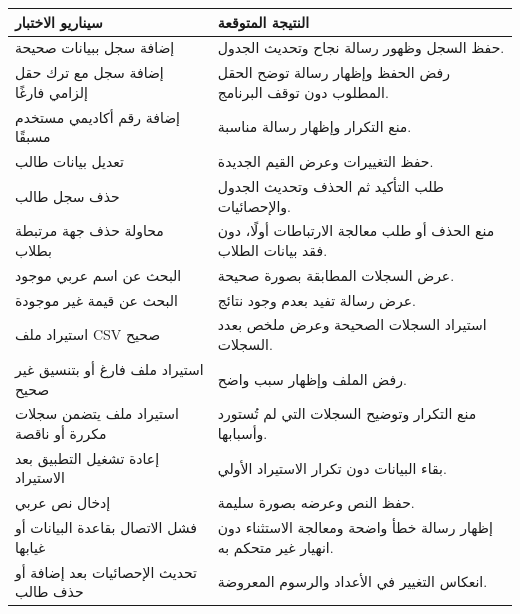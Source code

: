\documentclass[12pt,a4paper]{article}
\begin{document}
\begin{longtable}{|p{6cm}|p{8cm}|}
\hline
\textbf{سيناريو الاختبار} & \textbf{النتيجة المتوقعة}\\ \hline
إضافة سجل ببيانات صحيحة & حفظ السجل وظهور رسالة نجاح وتحديث الجدول.\\ \hline
إضافة سجل مع ترك حقل إلزامي فارغًا & رفض الحفظ وإظهار رسالة توضح الحقل المطلوب دون توقف البرنامج.\\ \hline
إضافة رقم أكاديمي مستخدم مسبقًا & منع التكرار وإظهار رسالة مناسبة.\\ \hline
تعديل بيانات طالب & حفظ التغييرات وعرض القيم الجديدة.\\ \hline
حذف سجل طالب & طلب التأكيد ثم الحذف وتحديث الجدول والإحصائيات.\\ \hline
محاولة حذف جهة مرتبطة بطلاب & منع الحذف أو طلب معالجة الارتباطات أولًا، دون فقد بيانات الطلاب.\\ \hline
البحث عن اسم عربي موجود & عرض السجلات المطابقة بصورة صحيحة.\\ \hline
البحث عن قيمة غير موجودة & عرض رسالة تفيد بعدم وجود نتائج.\\ \hline
استيراد ملف CSV صحيح & استيراد السجلات الصحيحة وعرض ملخص بعدد السجلات.\\ \hline
استيراد ملف فارغ أو بتنسيق غير صحيح & رفض الملف وإظهار سبب واضح.\\ \hline
استيراد ملف يتضمن سجلات مكررة أو ناقصة & منع التكرار وتوضيح السجلات التي لم تُستورد وأسبابها.\\ \hline
إعادة تشغيل التطبيق بعد الاستيراد & بقاء البيانات دون تكرار الاستيراد الأولي.\\ \hline
إدخال نص عربي & حفظ النص وعرضه بصورة سليمة.\\ \hline
فشل الاتصال بقاعدة البيانات أو غيابها & إظهار رسالة خطأ واضحة ومعالجة الاستثناء دون انهيار غير متحكم به.\\ \hline
تحديث الإحصائيات بعد إضافة أو حذف طالب & انعكاس التغيير في الأعداد والرسوم المعروضة.\\ \hline
\end{longtable}
\end{document}
